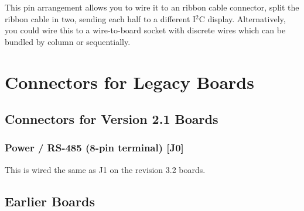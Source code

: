 This pin arrangement allows you to wire it to an  ribbon cable connector, split the ribbon cable in two, sending each half to a different
I$^2$C display. Alternatively, you could wire this to a wire-to-board socket with discrete wires which can be bundled by column or sequentially.

{\color{gray}
\section{Connectors for Legacy Boards}
\subsection{Connectors for Version 2.1 Boards}
\subsubsection{Power / RS-485 (8-pin terminal) [J0]}
This is wired the same as J1 on the revision 3.2 boards.
\subsection{Earlier Boards}
}
